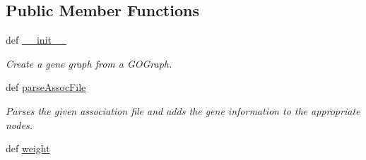 \subsection*{Public Member Functions}
\begin{DoxyCompactItemize}
\item 
def \hyperlink{classgographer_1_1_g_o_gene_graph_1_1_g_o_gene_graph_a5bda5262ae295bf2f4e299dde69eedb0}{\-\_\-\-\_\-init\-\_\-\-\_\-}
\begin{DoxyCompactList}\small\item\em Create a gene graph from a G\-O\-Graph. \end{DoxyCompactList}\item 
def \hyperlink{classgographer_1_1_g_o_gene_graph_1_1_g_o_gene_graph_ac7a1db7234457886844d399b314bb061}{parse\-Assoc\-File}
\begin{DoxyCompactList}\small\item\em Parses the given association file and adds the gene information to the appropriate nodes. \end{DoxyCompactList}\item 
\hypertarget{classgographer_1_1_g_o_gene_graph_1_1_g_o_gene_graph_a0ce6322f9420cca7b54b6d78a8639454}{def \hyperlink{classgographer_1_1_g_o_gene_graph_1_1_g_o_gene_graph_a0ce6322f9420cca7b54b6d78a8639454}{weight}}\label{classgographer_1_1_g_o_gene_graph_1_1_g_o_gene_graph_a0ce6322f9420cca7b54b6d78a8639454}


\end{DoxyCompactItemize}
